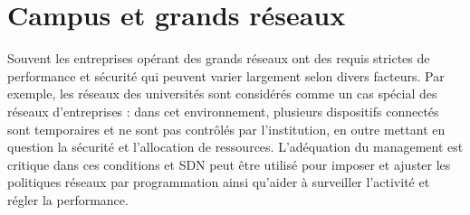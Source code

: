 


\section{Campus et grands réseaux}

Souvent les entreprises opérant des grands réseaux ont des requis strictes de performance et sécurité qui peuvent varier largement selon divers facteurs. Par exemple, les réseaux des universités sont considérés comme un cas spécial des réseaux d'entreprises : dans cet environnement, plusieurs dispositifs connectés sont temporaires et ne sont pas contrôlés par l'institution, en outre mettant en question la sécurité et l'allocation de ressources. L'adéquation du management est critique dans ces conditions et SDN peut être utilisé pour imposer et ajuster les politiques réseaux par programmation ainsi qu'aider à surveiller l'activité et régler la performance.


